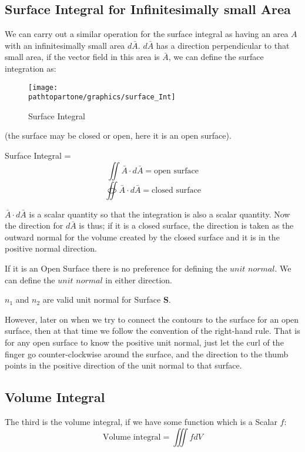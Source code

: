 \subsection{Surface Integral for Infinitesimally small Area}
We can carry out a similar operation for the surface integral as having an area $A$ with an infinitesimally small area $d\bar{A}$. $d\bar{A}$ has a direction perpendicular to that small area, if the vector field in this area is $\bar{A}$, we can define the surface integration as:
\begin{figure}
\centering
\texttt{[image: \\pathtopartone/graphics/surface\_Int]}
\caption{Surface Integral}
\end{figure}
(the surface may be closed or open, here it is an open surface).

Surface Integral =
\begin{equation*}
\iint \bar{A} \cdot d\bar{A}= \text{open surface}
\end{equation*}
\begin{equation}
\oiint \bar{A} \cdot d\bar{A} = \text{closed surface}
\end{equation}

$\bar{A} \cdot d\bar{A}$ is a scalar quantity so that the integration is also a scalar quantity. Now the direction for $d\bar{A}$ is thus; if it is a closed surface, the direction is taken as the outward normal for the volume created by the closed surface and it is in the positive normal direction.

If it is an Open Surface there is no preference for defining the $unit$ $normal$. We can define the $unit$ $normal$ in either direction.

$n_1$ and $n_2$ are valid unit normal for Surface \textbf{S}.

However, later on when we try to connect the contours to the surface for an open surface, then at that time we follow the convention of the right-hand rule. That is for any open surface to know the positive unit normal, just let the curl of the finger go counter-clockwise around the surface, and the direction to the thumb points in the positive direction of the unit normal to that surface.

\subsection{Volume Integral}
The third is the volume integral, if we have some function which is a Scalar $f$:
\begin{dmath*}
\text{Volume integral} = \iiint fdV
\end{dmath*}

